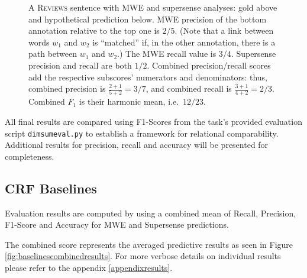 \begin{figure}[H]
\caption{A \textsc{Reviews} sentence with MWE and supersense analyses: gold above and hypothetical prediction below. 
MWE precision of the bottom annotation relative to the top one is $2/5$. %
(Note that a link between words $w_1$ and $w_2$ is ``matched'' 
if, in the other annotation, there is a path between $w_1$ and $w_2$.) 
The MWE recall value is $3/4$. 
Supersense precision and recall are both $1/2$.
Combined precision/recall scores add the respective subscores' numerators and denominators:
thus, combined precision is $\tfrac{2+1}{5+2} = 3/7$, 
and combined recall is $\tfrac{3+1}{4+2} = 2/3$.
Combined $F_1$ is their harmonic mean, i.e.~$12/23$.
}
\label{fig:linkmeasure}
\end{figure}

All final results are compared using F1-Scores from the \dimsum task's provided evaluation script \texttt{dimsumeval.py} to establish a framework for relational comparability. Additional results for precision, recall and accuracy will be presented for completeness.

\subsection{CRF Baselines}

Evaluation results are computed by using a combined mean of Recall, Precision, F1-Score and Accuracy for MWE and Supersense predictions. 

The combined score represents the averaged predictive results as seen in Figure \ref{fig:baselinescombinedresults}. For more verbose details on individual results please refer to the appendix \ref{appendixresults}.

